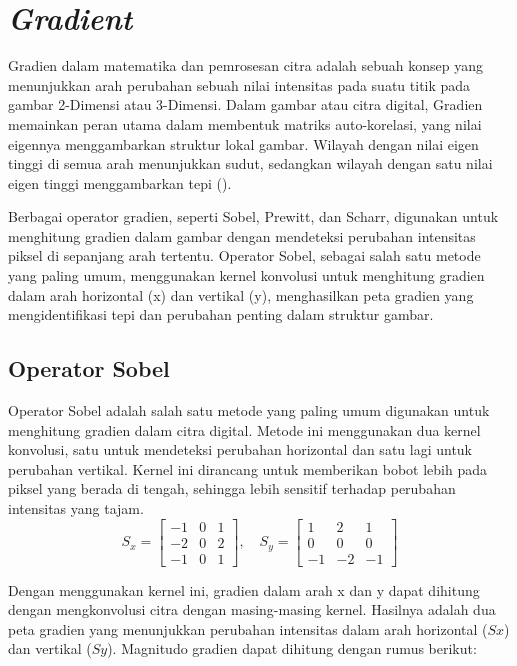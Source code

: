 \section{\emph{Gradient}}
  Gradien dalam matematika dan pemrosesan citra adalah sebuah konsep yang menunjukkan arah perubahan sebuah nilai intensitas pada suatu titik pada gambar 2-Dimensi atau 3-Dimensi. 
Dalam gambar atau citra digital, Gradien memainkan peran utama dalam membentuk matriks auto-korelasi, yang nilai eigennya menggambarkan struktur lokal gambar. 
Wilayah dengan nilai eigen tinggi di semua arah menunjukkan sudut, sedangkan wilayah dengan satu nilai eigen tinggi menggambarkan tepi (\cite[hlm. 305--306]{Sanchez2018}).

  Berbagai operator gradien, seperti Sobel, Prewitt, dan Scharr, digunakan untuk menghitung gradien dalam gambar dengan mendeteksi perubahan intensitas piksel di sepanjang arah tertentu. 
Operator Sobel, sebagai salah satu metode yang paling umum, menggunakan kernel konvolusi untuk menghitung gradien dalam arah horizontal (x) dan vertikal (y), menghasilkan peta gradien yang mengidentifikasi tepi dan perubahan penting dalam struktur gambar.
\subsection{Operator Sobel}
  Operator Sobel adalah salah satu metode yang paling umum digunakan untuk menghitung gradien dalam citra digital. Metode ini menggunakan dua kernel konvolusi, satu untuk mendeteksi perubahan horizontal dan satu lagi untuk perubahan vertikal. Kernel ini dirancang untuk memberikan bobot lebih pada piksel yang berada di tengah, sehingga lebih sensitif terhadap perubahan intensitas yang tajam.
\begin{equation}
  S_x = \begin{bmatrix}
    -1 & 0 & 1 \\
    -2 & 0 & 2 \\
    -1 & 0 & 1
  \end{bmatrix}, \quad
  S_y = \begin{bmatrix}
    1 & 2 & 1 \\
    0 & 0 & 0 \\
    -1 & -2 & -1
  \end{bmatrix}
  \label{eq:sobel-kernel}
\end{equation}

  Dengan menggunakan kernel ini, gradien dalam arah x dan y dapat dihitung dengan mengkonvolusi citra dengan masing-masing kernel. Hasilnya adalah dua peta gradien yang menunjukkan perubahan intensitas dalam arah horizontal (\(Sx\)) dan vertikal (\(Sy\)). Magnitudo gradien dapat dihitung dengan rumus berikut:

